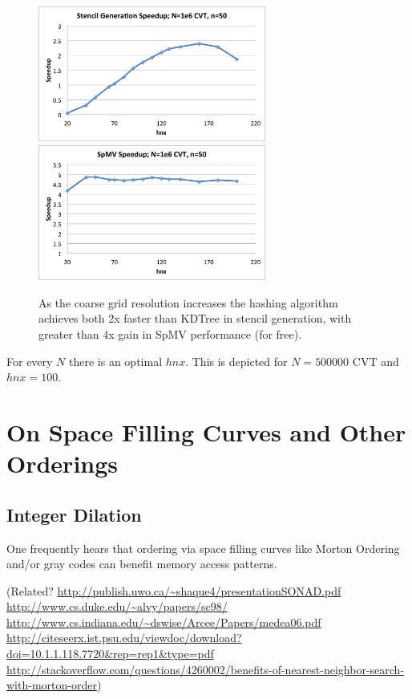 \documentclass{report}
\begin{document}
\begin{figure}
\centering
\includegraphics[width=7.5cm]{../figures/stencils/cvt1m_stencil_gen_speedup.png}
\includegraphics[width=7.5cm]{../figures/stencils/cvt1m_spmv_speedup.png} 
\caption{As the coarse grid resolution increases the hashing algorithm achieves both 2x faster than KDTree in stencil generation, with greater than 4x gain in SpMV performance (for free).}
\label{fig:hash_results}
\end{figure}

For every $N$ there is an optimal $hnx$. This is depicted for $N=500000$ CVT and $hnx=100$. 

\section{On Space Filling Curves and Other Orderings} 


\subsection{Integer Dilation}
One frequently hears that ordering via space filling curves like Morton Ordering and/or gray codes can benefit memory access patterns. 

(Related? \url{http://publish.uwo.ca/~shaque4/presentationSONAD.pdf} \url{http://www.cs.duke.edu/~alvy/papers/sc98/} \url{http://www.cs.indiana.edu/~dswise/Arcee/Papers/medea06.pdf} \url{http://citeseerx.ist.psu.edu/viewdoc/download?doi=10.1.1.118.7720&rep=rep1&type=pdf} \url{http://stackoverflow.com/questions/4260002/benefits-of-nearest-neighbor-search-with-morton-order})
\end{document}
